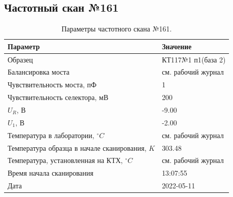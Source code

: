\subsection{Частотный скан №161}
\begin{table}[!ht]
    \centering
    \caption{Параметры частотного скана №161.}
    \begin{tabular}{|l|l|}
        \hline
        Параметр                                       & Значение                  \\ \hline
        Образец                                        & КТ117№1 п1(база 2)        \\ \hline
        Балансировка моста                             & см. рабочий журнал        \\ \hline
        Чувствительность моста, пФ                     & 1                         \\ \hline
        Чувствительность селектора, мВ                 & 200                       \\ \hline
        $U_R$, В                                       & -9.00                     \\ \hline
        $U_1$, В                                       & -2.00                     \\ \hline
        Температура в лаборатории, $^\circ C$          & см. рабочий журнал        \\ \hline
        Температура образца в начале сканирования, $K$ & 303.48                    \\ \hline
        Температура, установленная на КТХ, $^\circ C$  & см. рабочий журнал        \\ \hline
        Время начала сканирования                      & 13:07:55                  \\ \hline
        Дата                                           & 2022-05-11                \\ \hline
    \end{tabular}
    \label{table:frequency_scan_161}
\end{table}

